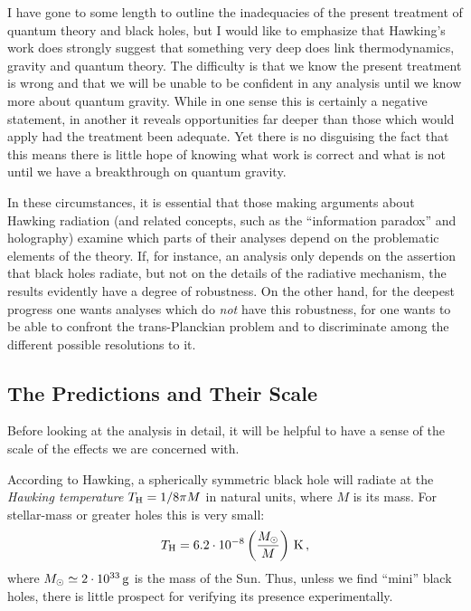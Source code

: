 \documentclass[12pt]{article}
\begin{document}
I have gone to some length to outline the inadequacies of the present treatment of quantum theory and black holes,
but I would like to emphasize that Hawking's work does 
strongly suggest that something very deep does link thermodynamics, gravity and quantum theory.  The difficulty is that we know the present treatment is wrong and that we will be unable to be confident in any analysis until we know more about quantum gravity.
While in one sense this is certainly a negative statement, in another it reveals opportunities far deeper than those which would apply had the treatment been adequate.
Yet there is no disguising the fact that this means there is little hope of knowing what work is correct 
and what is not until we have a breakthrough on quantum gravity.

In these circumstances, it is essential that those making arguments about Hawking radiation (and related concepts, such as the ``information paradox'' and  holography) examine which parts of their analyses depend on the problematic elements of the theory.  If, for instance, an analysis only depends on the assertion that black holes radiate, but not on the details of the radiative mechanism, the results evidently have a degree of robustness.  On the other hand, for the deepest progress one wants analyses which do {\em not} have this robustness, for one wants to be able to 
confront the trans-Planckian problem and to
discriminate among the different possible resolutions to it.


\subsection{The Predictions and Their Scale}

Before looking at the analysis in detail, it will be helpful to have a sense of the scale of the effects we are concerned with.

According to Hawking, a spherically symmetric black hole will radiate at the {\em Hawking temperature} $T_{\rm H}=1/8\pi M$ in natural units, where $M$ is its mass.  For stellar-mass or greater holes this is very small:
\begin{equation}
  T_{\rm H}=6.2\cdot 10^{-8} \left(\frac{M_\odot}{M}\right) \, {\rm K}\, ,
\end{equation}
where $M_\odot\simeq 2\cdot 10^{33}\, {\rm g}$ is the mass of the Sun.
Thus, unless we find ``mini'' black holes, there is little prospect for verifying its presence experimentally.
\end{document}
